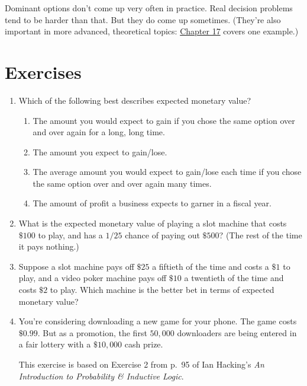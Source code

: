 \documentclass[justified]{tufte-book}
\providecommand{\tightlist}{%
  \setlength{\itemsep}{0pt}\setlength{\parskip}{0pt}}
\theoremstyle{definition}
\theoremstyle{definition}
\theoremstyle{definition}
\theoremstyle{remark}
\begin{document}
Dominant options don't come up very often in practice. Real decision problems tend to be harder than that. But they do come up sometimes. (They're also important in more advanced, theoretical topics: \protect\hyperlink{dutch-books-1}{Chapter 17} covers one example.)

\hypertarget{exercises-8}{%
\section*{Exercises}\label{exercises-8}}

\begin{enumerate}
\item
  Which of the following best describes expected monetary value?

  \begin{enumerate}
  \def\labelenumii{\alph{enumii}.}
  \tightlist
  \item
    The amount you would expect to gain if you chose the same option over and over again for a long, long time.
  \item
    The amount you expect to gain/lose.
  \item
    The average amount you would expect to gain/lose each time if you chose the same option over and over again many times.
  \item
    The amount of profit a business expects to garner in a fiscal year.
  \end{enumerate}
\item
  What is the expected monetary value of playing a slot machine that costs \(\$100\) to play, and has a \(1/25\) chance of paying out \(\$500\)? (The rest of the time it pays nothing.)
\item
  Suppose a slot machine pays off \(\$25\) a fiftieth of the time and costs a \(\$1\) to play, and a video poker machine pays off \(\$10\) a twentieth of the time and costs \(\$2\) to play. Which machine is the better bet in terms of expected monetary value?
\item
  You're considering downloading a new game for your phone. The game costs \(\$0.99\). But as a promotion, the first \(50,000\) downloaders are being entered in a fair lottery with a \(\$10,000\) cash prize.

  \begin{marginfigure}
  This exercise is based on Exercise 2 from p.~95 of Ian Hacking's
  \emph{An Introduction to Probability \& Inductive Logic}.
  \end{marginfigure}


\end{enumerate}
\end{document}
